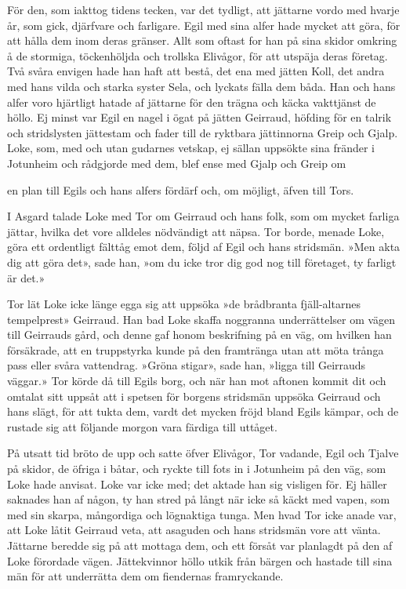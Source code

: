 För den, som iakttog tidens tecken, var det tydligt, att jättarne vordo
med hvarje år, som gick, djärfvare och farligare. Egil med sina alfer
hade mycket att göra, för att hålla dem inom deras gränser. Allt som
oftast for han på sina skidor omkring å de stormiga, töckenhöljda och
trollska Elivågor, för att utspäja deras företag. Två svåra envigen hade
han haft att bestå, det ena med jätten Koll, det andra med hans vilda
och starka syster Sela, och lyckats fälla dem båda. Han och hans alfer
voro hjärtligt hatade af jättarne för den trägna och käcka vakttjänst de
höllo. Ej minst var Egil en nagel i ögat på jätten Geirraud, höfding för
en talrik och stridslysten jättestam och fader till de ryktbara
jättinnorna Greip och Gjalp. Loke, som, med och utan gudarnes vetskap,
ej sällan uppsökte sina fränder i Jotunheim och rådgjorde med dem, blef
ense med Gjalp och Greip om

en plan till Egils och hans alfers fördärf och, om möjligt, äfven till
Tors.

I Asgard talade Loke med Tor om Geirraud och hans folk, som om mycket
farliga jättar, hvilka det vore alldeles nödvändigt att näpsa. Tor
borde, menade Loke, göra ett ordentligt fälttåg emot dem, följd af Egil
och hans stridsmän. »Men akta dig att göra det», sade han, »om du icke
tror dig god nog till företaget, ty farligt är det.»

Tor lät Loke icke länge egga sig att uppsöka »de brådbranta
fjäll-altarnes tempelprest» Geirraud. Han bad Loke skaffa noggranna
underrättelser om vägen till Geirrauds gård, och denne gaf honom
beskrifning på en väg, om hvilken han försäkrade, att en truppstyrka
kunde på den framtränga utan att möta trånga pass eller svåra
vattendrag. »Gröna stigar», sade han, »ligga till Geirrauds väggar.» Tor
körde då till Egils borg, och när han mot aftonen kommit dit och omtalat
sitt uppsåt att i spetsen för borgens stridsmän uppsöka Geirraud och
hans slägt, för att tukta dem, vardt det mycken fröjd bland Egils
kämpar, och de rustade sig att följande morgon vara färdiga till
uttåget.

På utsatt tid bröto de upp och satte öfver Elivågor, Tor vadande, Egil
och Tjalve på skidor, de öfriga i båtar, och ryckte till fots in i
Jotunheim på den väg, som Loke hade anvisat. Loke var icke med; det
aktade han sig visligen för. Ej häller saknades han af någon, ty han
stred på långt när icke så käckt med vapen, som med sin skarpa,
mångordiga och lögnaktiga tunga. Men hvad Tor icke anade var, att Loke
låtit Geirraud veta, att asaguden och hans stridsmän vore att vänta.
Jättarne beredde sig på att mottaga dem, och ett försåt var planlagdt på
den af Loke förordade vägen. Jättekvinnor höllo utkik från bärgen och
hastade till sina män för att underrätta dem om fiendernas framryckande.

